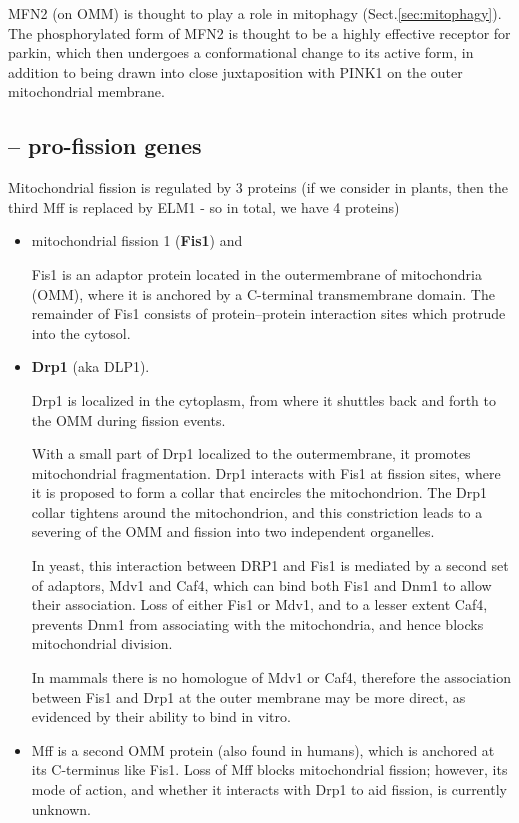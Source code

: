   MFN2 (on OMM) is thought to play a role in mitophagy (Sect.\ref{sec:mitophagy}). The
  phosphorylated form of MFN2 is thought to be a highly effective receptor for
  parkin, which then undergoes a conformational change to its active form, in
  addition to being drawn into close juxtaposition with PINK1 on the outer
  mitochondrial membrane.
  

\subsection{-- pro-fission genes}

 Mitochondrial fission is regulated by 3 proteins (if we consider in plants,
 then the third Mff is replaced by ELM1 - so in total, we have 4 proteins)
\begin{itemize}

  \item  mitochondrial fission 1
  ({\bf Fis1}) and 
  
  Fis1 is an adaptor protein located in the outermembrane of mitochondria (OMM),
  where it is anchored by a C-terminal transmembrane domain.
  The remainder of Fis1 consists of protein–protein interaction sites which protrude into the cytosol.
  
  \item {\bf Drp1} (aka DLP1).

Drp1 is localized in the cytoplasm,  from where it shuttles back and forth to the OMM during fission events.

With a small part of Drp1 localized to the outermembrane, it promotes
mitochondrial fragmentation. Drp1 interacts with Fis1 at fission sites, where it
is proposed to form a collar that encircles the mitochondrion. The Drp1 collar
tightens around the mitochondrion, and this constriction leads to a severing of
the OMM and fission into two independent organelles.

In yeast, this interaction between DRP1 and Fis1 is mediated by a second set of
adaptors, Mdv1 and Caf4, which can bind both Fis1 and Dnm1 to allow their
association.  Loss of either Fis1 or Mdv1, and to a lesser extent Caf4, prevents
Dnm1 from associating with the mitochondria, and hence blocks mitochondrial
division.

In mammals there is no homologue of Mdv1 or Caf4, therefore the association
between Fis1 and Drp1 at the outer membrane may be more direct, as evidenced by
their ability to bind in vitro.


   \item Mff is a second OMM protein (also found in humans), which is anchored
   at its C-terminus like Fis1. Loss of Mff blocks mitochondrial fission;
   however, its mode of action, and whether it interacts with Drp1 to aid
   fission, is currently unknown.
   

\end{itemize}
